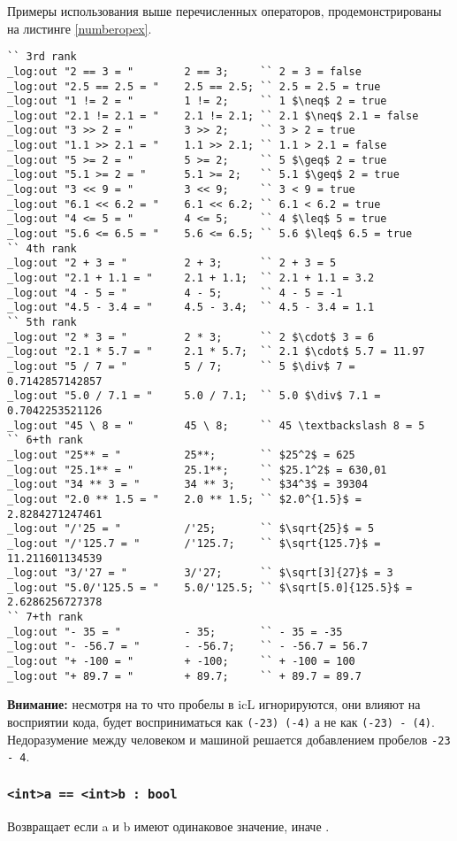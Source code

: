 \documentclass[a4paper, 14pt]{extarticle}
\begin{document}
	Примеры использования выше перечисленных операторов, продемонстрированы на листинге \ref{numberopex}.
	
\begin{lstlisting}[caption=Примеры использования операторов над данными типа int и double, label=numberopex]
`` 3rd rank
_log:out "2 == 3 = "		2 == 3;		`` 2 = 3 = false
_log:out "2.5 == 2.5 = "	2.5 == 2.5;	`` 2.5 = 2.5 = true
_log:out "1 != 2 = "		1 != 2;		`` 1 $\neq$ 2 = true
_log:out "2.1 != 2.1 = "	2.1 != 2.1;	`` 2.1 $\neq$ 2.1 = false
_log:out "3 >> 2 = "		3 >> 2;		`` 3 > 2 = true
_log:out "1.1 >> 2.1 = "	1.1 >> 2.1;	`` 1.1 > 2.1 = false
_log:out "5 >= 2 = "		5 >= 2;		`` 5 $\geq$ 2 = true
_log:out "5.1 >= 2 = "		5.1 >= 2;	`` 5.1 $\geq$ 2 = true
_log:out "3 << 9 = "		3 << 9;		`` 3 < 9 = true
_log:out "6.1 << 6.2 = "	6.1 << 6.2;	`` 6.1 < 6.2 = true
_log:out "4 <= 5 = "		4 <= 5;		`` 4 $\leq$ 5 = true
_log:out "5.6 <= 6.5 = "	5.6 <= 6.5;	`` 5.6 $\leq$ 6.5 = true
`` 4th rank
_log:out "2 + 3 = "			2 + 3;		`` 2 + 3 = 5
_log:out "2.1 + 1.1 = "		2.1 + 1.1;	`` 2.1 + 1.1 = 3.2
_log:out "4 - 5 = "			4 - 5;		`` 4 - 5 = -1
_log:out "4.5 - 3.4 = "		4.5 - 3.4;	`` 4.5 - 3.4 = 1.1
`` 5th rank
_log:out "2 * 3 = "			2 * 3;		`` 2 $\cdot$ 3 = 6
_log:out "2.1 * 5.7 = "		2.1 * 5.7;	`` 2.1 $\cdot$ 5.7 = 11.97
_log:out "5 / 7 = "			5 / 7;		`` 5 $\div$ 7 = 0.7142857142857
_log:out "5.0 / 7.1 = "		5.0 / 7.1;	`` 5.0 $\div$ 7.1 = 0.7042253521126
_log:out "45 \ 8 = "		45 \ 8;		`` 45 \textbackslash 8 = 5
`` 6+th rank
_log:out "25** = "			25**;		`` $25^2$ = 625
_log:out "25.1** = "		25.1**;		`` $25.1^2$ = 630,01
_log:out "34 ** 3 = "		34 ** 3;	`` $34^3$ = 39304
_log:out "2.0 ** 1.5 = "	2.0 ** 1.5;	`` $2.0^{1.5}$ = 2.8284271247461
_log:out "/'25 = "			/'25;		`` $\sqrt{25}$ = 5
_log:out "/'125.7 = "		/'125.7;	`` $\sqrt{125.7}$ = 11.211601134539
_log:out "3/'27 = "			3/'27;		`` $\sqrt[3]{27}$ = 3
_log:out "5.0/'125.5 = "	5.0/'125.5;	`` $\sqrt[5.0]{125.5}$ = 2.6286256727378
`` 7+th rank
_log:out "- 35 = "			- 35;		`` - 35 = -35
_log:out "- -56.7 = "		- -56.7;	`` - -56.7 = 56.7
_log:out "+ -100 = "		+ -100;		`` + -100 = 100
_log:out "+ 89.7 = "		+ 89.7;		`` + 89.7 = 89.7
\end{lstlisting}

	{\bf Внимание:} несмотря на то что пробелы в icL игнорируются, они влияют на восприятии кода,  будет восприниматься как \lstinline`(-23) (-4)` а не как \lstinline`(-23) - (4)`. Недоразумение между человеком и машиной решается добавлением пробелов \lstinline`-23  - 4`.

\subsubsection{\lstinline`<int>a == <int>b : bool`}
	Возвращает  если a и b имеют одинаковое значение, иначе .
\end{document}
